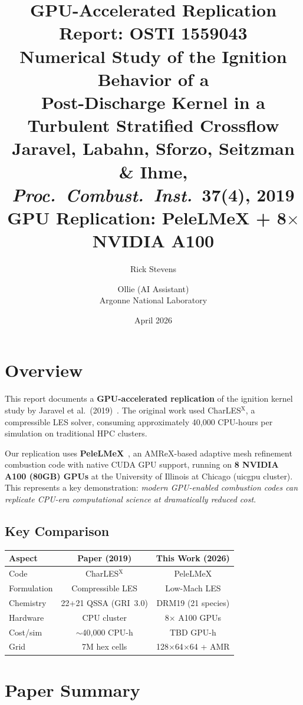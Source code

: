 \documentclass[11pt]{article}
\title{\textbf{GPU-Accelerated Replication Report: OSTI 1559043}\\[0.3em]
\large Numerical Study of the Ignition Behavior of a\\
Post-Discharge Kernel in a Turbulent Stratified Crossflow\\[0.3em]
\normalsize Jaravel, Labahn, Sforzo, Seitzman \& Ihme,\\
\textit{Proc.\ Combust.\ Inst.}\ \textbf{37}(4), 2019\\[0.5em]
\textcolor{oursred}{\textbf{GPU Replication: PeleLMeX + 8$\times$ NVIDIA A100}}}
\author{Rick Stevens \and Ollie (AI Assistant)\\
Argonne National Laboratory}
\date{April 2026}
\begin{document}
\maketitle
\thispagestyle{fancy}

\section{Overview}

This report documents a \textbf{GPU-accelerated replication} of the ignition kernel study by Jaravel et al.\ (2019)~\cite{jaravel2019}. The original work used CharLES$^{\mathrm{X}}$, a compressible LES solver, consuming approximately 40,000 CPU-hours per simulation on traditional HPC clusters.

Our replication uses \textbf{PeleLMeX}~\cite{pelelm2024}, an AMReX-based adaptive mesh refinement combustion code with native CUDA GPU support, running on \textbf{8 NVIDIA A100 (80GB) GPUs} at the University of Illinois at Chicago (uicgpu cluster). This represents a key demonstration: \textit{modern GPU-enabled combustion codes can replicate CPU-era computational science at dramatically reduced cost}.

\subsection{Key Comparison}
\begin{center}
\begin{tabular}{@{}lcc@{}}
\toprule
\textbf{Aspect} & \textbf{Paper (2019)} & \textbf{This Work (2026)} \\
\midrule
Code & CharLES$^{\mathrm{X}}$ & PeleLMeX \\
Formulation & Compressible LES & Low-Mach LES \\
Chemistry & 22+21 QSSA (GRI~3.0) & DRM19 (21 species) \\
Hardware & CPU cluster & 8$\times$ A100 GPUs \\
Cost/sim & $\sim$40,000 CPU-h & \textcolor{oursred}{TBD GPU-h} \\
Grid & 7M hex cells & 128$\times$64$\times$64 + AMR \\
\bottomrule
\end{tabular}
\end{center}

\section{Paper Summary}
\end{document}
